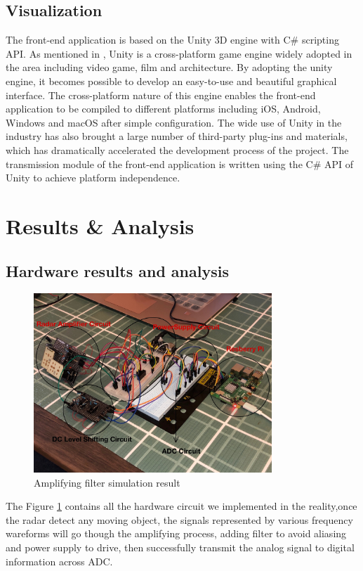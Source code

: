 \subsection{Visualization}
The front-end application is based on the Unity 3D engine with C\# scripting API. As mentioned in \textcite{unity}, Unity is a cross-platform game engine widely adopted in the area including video game, film and architecture. By adopting the unity engine, it becomes possible to develop an easy-to-use and beautiful graphical interface. The cross-platform nature of this engine enables the front-end application to be compiled to different platforms including iOS, Android, Windows and macOS after simple configuration. The wide use of Unity in the industry has also brought a large number of third-party plug-ins and materials, which has dramatically accelerated the development process of the project. The transmission module of the front-end application is written using the C\# API of Unity to achieve platform independence.

\newpage
\section{Results \& Analysis}
\subsection{Hardware results and analysis}
\begin{figure}[H]
    \centering
    \includegraphics[width=0.8\textwidth]{figure/Hardware Appearance.jpg}
    \caption{Amplifying filter simulation result}
     \label{fig:hardware}
\end{figure}
The Figure \ref{fig:hardware} contains all the hardware circuit we implemented in the reality,once the radar detect any moving object, the signals represented by various frequency wareforms will go though the amplifying process, adding filter to avoid aliasing and power supply to drive, then successfully transmit the analog signal to digital information across ADC.
